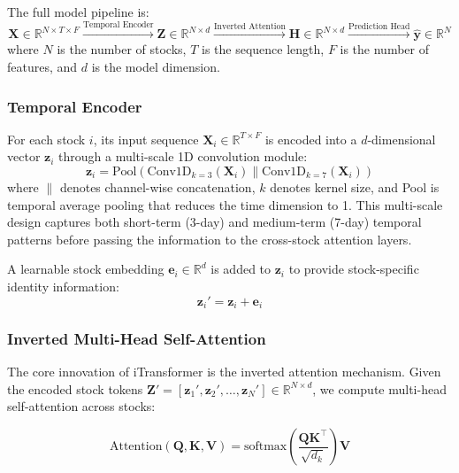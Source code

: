 \documentclass[12pt, a4paper]{article}
\begin{document}
The full model pipeline is:
\begin{equation}
\mathbf{X} \in \mathbb{R}^{N \times T \times F} \xrightarrow{\text{Temporal Encoder}} \mathbf{Z} \in \mathbb{R}^{N \times d} \xrightarrow{\text{Inverted Attention}} \mathbf{H} \in \mathbb{R}^{N \times d} \xrightarrow{\text{Prediction Head}} \hat{\mathbf{y}} \in \mathbb{R}^{N}
\end{equation}
where $N$ is the number of stocks, $T$ is the sequence length, $F$ is the number of features, and $d$ is the model dimension.

\subsubsection{Temporal Encoder}

For each stock $i$, its input sequence $\mathbf{X}_i \in \mathbb{R}^{T \times F}$ is encoded into a $d$-dimensional vector $\mathbf{z}_i$ through a multi-scale 1D convolution module:
\begin{equation}
\mathbf{z}_i = \text{Pool}\left( \text{Conv1D}_{k=3}(\mathbf{X}_i) \| \text{Conv1D}_{k=7}(\mathbf{X}_i) \right)
\end{equation}
where $\|$ denotes channel-wise concatenation, $k$ denotes kernel size, and Pool is temporal average pooling that reduces the time dimension to 1. This multi-scale design captures both short-term (3-day) and medium-term (7-day) temporal patterns before passing the information to the cross-stock attention layers.

A learnable stock embedding $\mathbf{e}_i \in \mathbb{R}^{d}$ is added to $\mathbf{z}_i$ to provide stock-specific identity information:
\begin{equation}
\mathbf{z}_i' = \mathbf{z}_i + \mathbf{e}_i
\end{equation}

\subsubsection{Inverted Multi-Head Self-Attention}

The core innovation of iTransformer is the inverted attention mechanism. Given the encoded stock tokens $\mathbf{Z}' = [\mathbf{z}_1', \mathbf{z}_2', \ldots, \mathbf{z}_N'] \in \mathbb{R}^{N \times d}$, we compute multi-head self-attention across stocks:

\begin{equation}
\text{Attention}(\mathbf{Q}, \mathbf{K}, \mathbf{V}) = \text{softmax}\left(\frac{\mathbf{Q}\mathbf{K}^\top}{\sqrt{d_k}}\right) \mathbf{V}
\end{equation}
\end{document}
